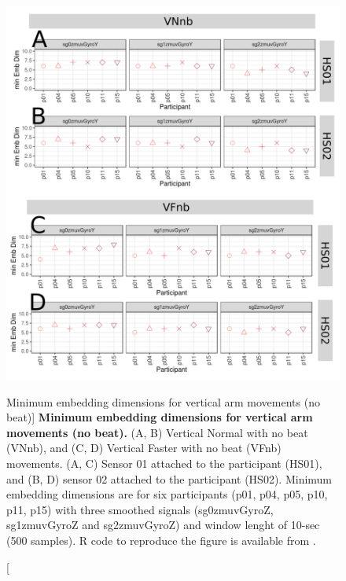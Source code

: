 \begin{figure}
\centering
\includegraphics[width=1.0\textwidth]{cao_Vnb_w10}
	\caption
	[Minimum embedding dimensions for vertical arm movements 
	(no beat)]{
	{\bf Minimum embedding dimensions for vertical arm movements 
	(no beat).} 
		(A, B) Vertical Normal with no beat (VNnb), and 
		(C, D) Vertical Faster with no beat (VFnb) movements.
		(A, C) Sensor 01 attached to the participant (HS01), and
		(B, D) sensor 02 attached to the participant (HS02).
		Minimum embedding dimensions are for six participants 
		(p01, p04, p05, p10, p11, p15) with three smoothed signals 
		(sg0zmuvGyroZ, sg1zmuvGyroZ and sg2zmuvGyroZ)
		and window lenght of 10-sec (500 samples).
		R code to reproduce the figure is available 
		from \cite{hwum2018}.
        }
    \label{fig:caoVnb}
\end{figure}

